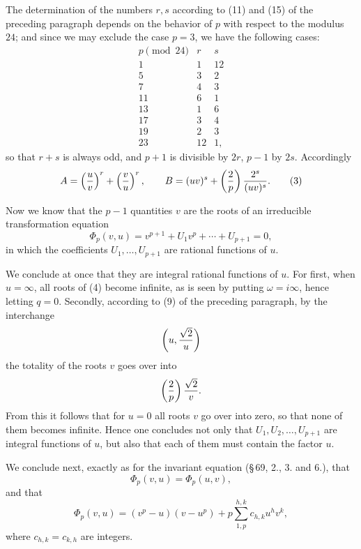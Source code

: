\documentclass[11pt]{article}
\begin{document}
The determination of the numbers $r,s$ according to (11) and (15) of the preceding paragraph depends on the behavior of $p$ with respect to the modulus $24$; and since we may exclude the case $p=3$, we have the following cases:
\begin{equation}
\begin{array}{c|cc}
 p\pmod{24} & r & s\\
\hline
 1  & 1  & 12\\
 5  & 3  & 2\\
 7  & 4  & 3\\
 11 & 6  & 1\\
 13 & 1  & 6\\
 17 & 3  & 4\\
 19 & 2  & 3\\
 23 & 12 & 1,
\end{array}
\tag{2}
\end{equation}
so that $r+s$ is always odd, and $p+1$ is divisible by $2r$, $p-1$ by $2s$. Accordingly
\begin{equation}
 A=\left({u\over v}\right)^r+\left({v\over u}\right)^r,
 \qquad
 B=(uv)^s+\left({2\over p}\right){2^s\over(uv)^s}.
\tag{3}
\end{equation}

Now we know that the $p-1$ quantities $v$ are the roots of an irreducible transformation equation
\begin{equation}
 \Phi_p(v,u)=v^{p+1}+U_1v^p+\cdots+U_{p+1}=0,
\tag{4}
\end{equation}
in which the coefficients $U_1,\ldots,U_{p+1}$ are rational functions of $u$.

We conclude at once that they are integral rational functions of $u$. For first, when $u=\infty$, all roots of (4) become infinite, as is seen by putting $\omega=i\infty$, hence letting $q=0$. Secondly, according to (9) of the preceding paragraph, by the interchange
\[
 \left(u,{\sqrt2\over u}\right)
\]
the totality of the roots $v$ goes over into
\[
 \left({2\over p}\right){\sqrt2\over v}.
\]
From this it follows that for $u=0$ all roots $v$ go over into zero, so that none of them becomes infinite. Hence one concludes not only that $U_1,U_2,\ldots,U_{p+1}$ are integral functions of $u$, but also that each of them must contain the factor $u$.

We conclude next, exactly as for the invariant equation (\S\,69, 2., 3. and 6.), that
\begin{equation}
 \Phi_p(v,u)=\Phi_p(u,v),
\tag{5}
\end{equation}
and that
\begin{equation}
 \Phi_p(v,u)=(v^p-u)(v-u^p)
 +p\sum_{1,p}^{h,k} c_{h,k}u^hv^k,
\tag{6}
\end{equation}
where $c_{h,k}=c_{k,h}$ are integers.
\end{document}
